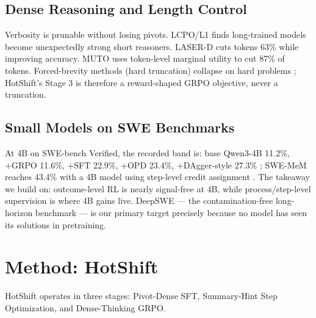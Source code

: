 \documentclass[conference]{IEEEtran}
\begin{document}
\subsection{Dense Reasoning and Length Control}
Verbosity is prunable without losing pivots. LCPO/L1 \cite{l1} finds long-trained models become unexpectedly strong short reasoners. LASER-D \cite{laser} cuts tokens 63\% while improving accuracy. MUTO \cite{muto} uses token-level marginal utility to cut 87\% of tokens. Forced-brevity methods (hard truncation) collapse on hard problems \cite{thoughtterminator}; HotShift's Stage 3 is therefore a reward-shaped GRPO objective, never a truncation.

\subsection{Small Models on SWE Benchmarks}
At 4B on SWE-bench Verified, the recorded band is: base Qwen3-4B 11.2\%, +GRPO 11.6\%, +SFT 22.9\%, +OPD 23.4\%, +DAgger-style 27.3\% \cite{swebench4b}; SWE-MeM reaches 43.4\% with a 4B model using step-level credit assignment \cite{swemem}. The takeaway we build on: outcome-level RL is nearly signal-free at 4B, while process/step-level supervision is where 4B gains live. DeepSWE \cite{deepswe} --- the contamination-free long-horizon benchmark --- is our primary target precisely because no model has seen its solutions in pretraining.

\section{Method: HotShift}
\label{sec:methodology}

HotShift operates in three stages: Pivot-Dense SFT, Summary-Hint Step Optimization, and Dense-Thinking GRPO.
\end{document}
